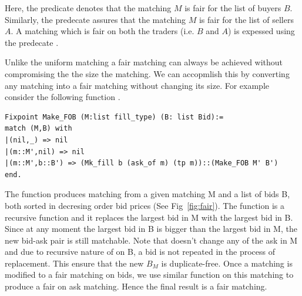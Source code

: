 \documentclass[a4paper,UKenglish,cleveref, autoref]{lipics-v2019}
\begin{document}
\begin{definition}
 \end{definition}
\begin{definition}
\end{definition}
\begin{definition}
\end{definition}

Here, the predicate   denotes that the matching $M$  is fair for the list of buyers $B$. Similarly,  the predecate  assures that the matching $M$  is fair for the list of sellers $A$.  A matching which is fair on both the traders (i.e. $B$ and $A$) is expessed using the predecate .

Unlike the uniform matching a fair matching can always be achieved without compromising the the size the matching. We can accopmlish this by converting any matching into a fair matching without changing its size. For example consider the following function .

\begin{verbatim}
Fixpoint Make_FOB (M:list fill_type) (B: list Bid):=
match (M,B) with 
|(nil,_) => nil
|(m::M',nil) => nil
|(m::M',b::B') => (Mk_fill b (ask_of m) (tp m))::(Make_FOB M' B')
end.
\end{verbatim}


The function  produces  matching from a given matching M and a list of bids B, both sorted in decresing order bid prices (See Fig~\ref{fig:fair}). The function  is a recursive function and it replaces the largest bid in M with the largest bid in B. Since at any moment the largest bid in B is bigger than the largest bid in M, the new bid-ask pair is still matchable. Note that  doesn't change any of the ask in M and due to recursive nature of  on B, a bid is not repeated in the process of replacement.  This ensure that the new $B_M$ is duplicate-free. Once a matching is modified to a fair matching on bids, we use similar function  on this matching to produce a fair on ask matching. Hence the final result is a fair matching. 
\end{document}
